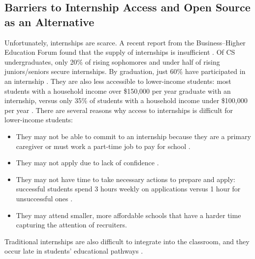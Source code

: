 \subsection{Barriers to Internship Access and Open Source as an Alternative}

Unfortunately, internships are scarce. A recent report from the Business--Higher Education Forum found that the supply of internships is insufficient \citep{bhefExpandingInternshipsHarnessing2024}. Of CS undergraduates, only 20\% of rising sophomores and under half of rising juniors/seniors secure internships. By graduation, just 60\% have participated in an internship \citep{kapoorExploringParticipationCS2020, kocClass2014Student2014}. They are also less accessible to lower-income students: most students with a household income over \$150,000 per year graduate with an internship, versus only 35\% of students with a household income under \$100,000 per year \citep{kapoorExploringParticipationCS2020}. There are several reasons why access to internships is difficult for lower-income students:
\begin{itemize}
    \item They may not be able to commit to an internship because they are a primary caregiver or must work a part-time job to pay for school \citep{kapoorBarriersSecuringIndustry2020}.

    \item They may not apply due to lack of confidence \citep{kapoorBarriersSecuringIndustry2020}.

    \item They may not have time to take necessary actions to prepare and apply: successful students spend 3 hours weekly on applications versus 1 hour for unsuccessful ones \citep{kapoorBarriersSecuringIndustry2020,kapoorExploringParticipationCS2020}.

    \item They may attend smaller, more affordable schools that have a harder time capturing the attention of recruiters.
\end{itemize}
Traditional internships are also difficult to integrate into the classroom, and they occur late in students' educational pathways \citep{luceroStructureCharacteristicsSuccessful2021,martincicCombiningRealWorldInternships2009}.

